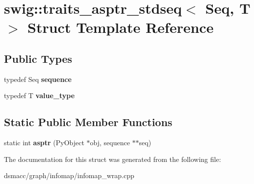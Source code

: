 \hypertarget{structswig_1_1traits__asptr__stdseq}{}\section{swig\+:\+:traits\+\_\+asptr\+\_\+stdseq$<$ Seq, T $>$ Struct Template Reference}
\label{structswig_1_1traits__asptr__stdseq}
\subsection*{Public Types}
\begin{DoxyCompactItemize}
\item 
\mbox{\label{structswig_1_1traits__asptr__stdseq_acc3237a1f41e649f169c938930068a35}} 
typedef Seq {\bfseries sequence}
\item 
\mbox{\label{structswig_1_1traits__asptr__stdseq_a18bb424b58bc29aa995ff6d246499ee5}} 
typedef T {\bfseries value\+\_\+type}
\end{DoxyCompactItemize}
\subsection*{Static Public Member Functions}
\begin{DoxyCompactItemize}
\item 
\mbox{\label{structswig_1_1traits__asptr__stdseq_a20c63611de0e0b36a51bf9b1ff41af48}} 
static int {\bfseries asptr} (Py\+Object $\ast$obj, sequence $\ast$$\ast$seq)
\end{DoxyCompactItemize}


The documentation for this struct was generated from the following file\+:\begin{DoxyCompactItemize}
\item 
dsmacc/graph/infomap/infomap\+\_\+wrap.\+cpp\end{DoxyCompactItemize}
